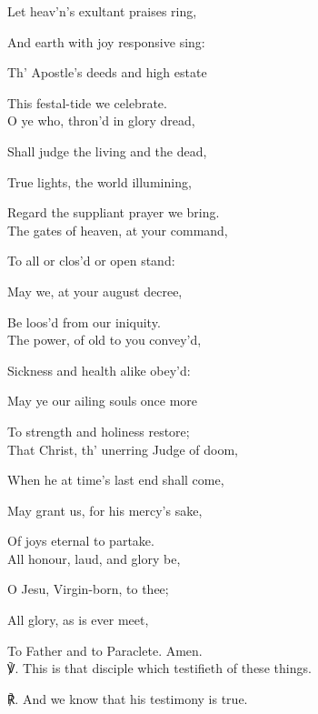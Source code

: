 \begin{multicols}{2}
Let heav'n's exultant praises ring,

And earth with joy responsive sing:

Th' Apostle's deeds and high estate

This festal-tide we celebrate.\\

O ye who, thron'd in glory dread,

Shall judge the living and the dead,

True lights, the world illumining,

Regard the suppliant prayer we bring.\\

The gates of heaven, at your command,

To all or clos'd or open stand:

May we, at your august decree,

Be loos'd from our iniquity.\\

The power, of old to you convey'd,

Sickness and health alike obey'd:

May ye our ailing souls once more

To strength and holiness restore;\\

That Christ, th' unerring Judge of doom,

When he at time's last end shall come,

May grant us, for his mercy's sake,

Of joys eternal to partake.\\

All honour, laud, and glory be,

O Jesu, Virgin-born, to thee;

All glory, as is ever meet,

To Father and to Paraclete. Amen.\\

℣. This is that disciple which testifieth of these things.

℟. And we know that his testimony is true.


\end{multicols}


